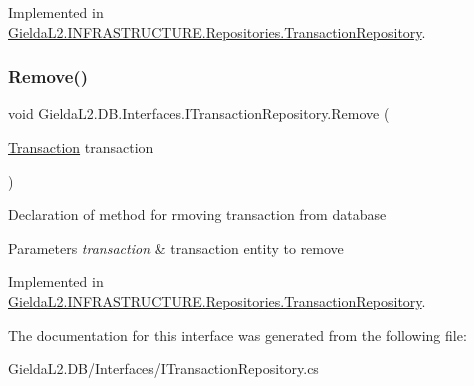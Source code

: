 Implemented in \mbox{\hyperlink{class_gielda_l2_1_1_i_n_f_r_a_s_t_r_u_c_t_u_r_e_1_1_repositories_1_1_transaction_repository_a97d31c2f5374525c76dc08d1ebaa8f52}{Gielda\+L2.\+I\+N\+F\+R\+A\+S\+T\+R\+U\+C\+T\+U\+R\+E.\+Repositories.\+Transaction\+Repository}}.

\mbox{\label{interface_gielda_l2_1_1_d_b_1_1_interfaces_1_1_i_transaction_repository_a6bd6442beda16c8af22a14457f1c6cc5}} 
\subsubsection{\texorpdfstring{Remove()}{Remove()}}
{\footnotesize\ttfamily void Gielda\+L2.\+D\+B.\+Interfaces.\+I\+Transaction\+Repository.\+Remove (\begin{DoxyParamCaption}\item[{\mbox{\hyperlink{class_gielda_l2_1_1_d_b_1_1_entities_1_1_transaction}{Transaction}}}]{transaction }\end{DoxyParamCaption})}



Declaration of method for rmoving transaction from database 


\begin{DoxyParams}{Parameters}
{\em transaction} & transaction entity to remove\\
\hline
\end{DoxyParams}


Implemented in \mbox{\hyperlink{class_gielda_l2_1_1_i_n_f_r_a_s_t_r_u_c_t_u_r_e_1_1_repositories_1_1_transaction_repository_aff0c2a4944edbe498dd4e2ccbc867679}{Gielda\+L2.\+I\+N\+F\+R\+A\+S\+T\+R\+U\+C\+T\+U\+R\+E.\+Repositories.\+Transaction\+Repository}}.



The documentation for this interface was generated from the following file\+:\begin{DoxyCompactItemize}
\item 
Gielda\+L2.\+D\+B/\+Interfaces/I\+Transaction\+Repository.\+cs\end{DoxyCompactItemize}
